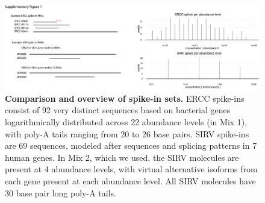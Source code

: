 \begin{figure}
    \centering
    \includegraphics[width=\textwidth]{"Supp Figure 1"}
    \caption[Comparison and overview of spike-in sets]{\textbf{Comparison and overview of spike-in sets.} ERCC spike-ins consist of 92 very distinct sequences based on bacterial genes logarithmically distributed across 22 abundance levels (in Mix 1), with poly-A tails ranging from 20 to 26 base pairs. SIRV spike-ins are 69 sequences, modeled after sequences and splicing patterns in 7 human genes. In Mix 2, which we used, the SIRV molecules are present at 4 abundance levels, with virtual alternative isoforms from each gene present at each abundance level. All SIRV molecules have 30 base pair long poly-A tails.}
    \label{fig:spikeins}
\end{figure}

